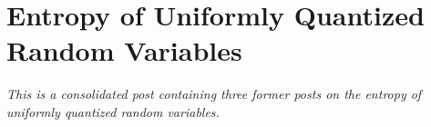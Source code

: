 \section{Entropy of Uniformly Quantized Random Variables}

\emph{This is a consolidated post containing three former posts on the entropy of uniformly quantized random variables.}




